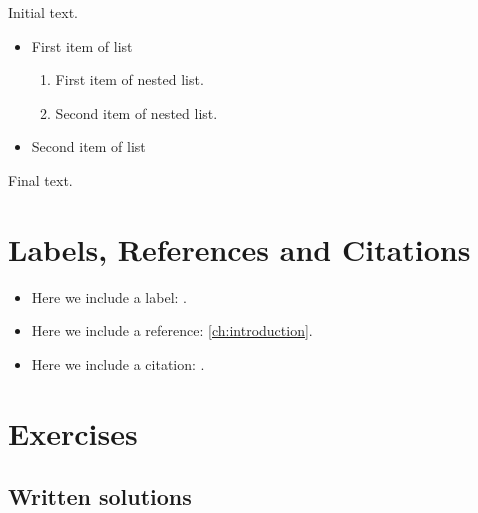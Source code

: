 \documentclass{camel}
\begin{document}
Initial text.
\begin{itemize}
\item First item of list
\begin{enumerate}
\item First item of nested list.
\item Second item of nested list.
\end{enumerate}
\item Second item of list
\end{itemize}
Final text.

\chapter{Labels, References and Citations}

\begin{itemize}
\item Here we include a label: \label{ch:introduction}.
\item Here we include a reference: \ref{ch:introduction}.
\item Here we include a citation: \cite{video_ex.1.1.1}.
\end{itemize}

\chapter{Exercises}\label{ch:exercises}

\section{Written solutions}\label{se:written-solutions}
\end{document}
